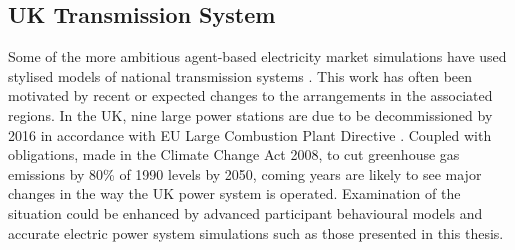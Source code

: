 
\subsection{UK Transmission System}
Some of the more ambitious agent-based electricity market simulations have used
stylised models of national transmission systems \cite{cincotti:09,weidlich:06}.
 This work has often been motivated by recent or expected changes to the
arrangements in the associated regions.
In the UK, nine large power stations are due to be decommissioned by 2016 in
accordance with EU Large Combustion Plant Directive \cite{ngt07lcpd}.  Coupled
with obligations, made in the Climate Change Act 2008, to cut greenhouse gas
emissions by 80\% of 1990 levels by 2050, coming years are likely to see major
changes in the way the UK power system is operated.
Examination of the situation could be enhanced by advanced participant
behavioural models and accurate electric power system simulations such as those
presented in this thesis.

